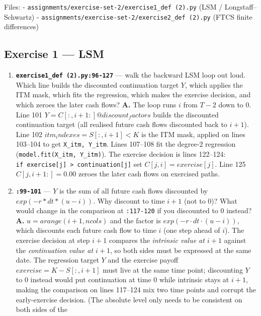 \documentclass[
  11pt,
]{article}
\begin{document}
Files: - \texttt{assignments/exercise-set-2/exercise1\_def\ (2).py} (LSM
/ Longstaff--Schwartz) -
\texttt{assignments/exercise-set-2/exercise2\_def\ (2).py} (FTCS finite
differences)

\hypertarget{exercise-1-lsm}{%
\subsection{Exercise 1 --- LSM}\label{exercise-1-lsm}}

\begin{enumerate}
\def\labelenumi{\arabic{enumi}.}
\item
  \textbf{\texttt{exercise1\_def\ (2).py:96-127}} --- walk the backward
  LSM loop out loud. Which line builds the discounted continuation
  target \(Y\), which applies the ITM mask, which fits the regression,
  which makes the exercise decision, and which zeroes the later cash
  flows? \textbf{A.} The loop runs \(i\) from \(T−2\) down to \(0\).
  Line 101 \(Y = C[:, i+1:] @ discount_factors\) builds the discounted
  continuation target (all realised future cash flows discounted back to
  \(i+1\)). Line 102 \(itm_indexes = S[:,i+1] < K\) is the ITM mask,
  applied on lines 103--104 to get \texttt{X\_itm,\ Y\_itm}. Lines
  107--108 fit the degree-2 regression
  (\texttt{model.fit(X\_itm,\ Y\_itm)}). The exercise decision is lines
  122--124:
  \texttt{if\ exercise{[}j{]}\ \textgreater{}\ continuation{[}j{]}} set
  \(C[j,i] = exercise[j]\). Line 125 \(C[j,i+1:] = 0.00\) zeroes the
  later cash flows on exercised paths.
\item
  \textbf{\texttt{:99-101}} --- \(Y\) is the sum of all future cash
  flows discounted by \(exp(-r*dt*(u-i))\). Why discount to time \(i+1\)
  (not to \(0\))? What would change in the comparison at
  \texttt{:117-120} if you discounted to \(0\) instead? \textbf{A.}
  \(u = arange(i+1, ncols)\) and the factor is \(exp(−r·dt·(u−i))\),
  which discounts each future cash flow to time \(i\) (one step ahead of
  \(i\)). The exercise decision at step \(i+1\) compares the
  \emph{intrinsic value at \(i+1\)} against the \emph{continuation value
  at \(i+1\)}, so both sides must be expressed at the same date. The
  regression target \(Y\) and the exercise payoff
  \(exercise = K − S[:,i+1]\) must live at the same time point;
  discounting \(Y\) to 0 instead would put continuation at time 0 while
  intrinsic stays at \(i+1\), making the comparison on lines 117--124
  mix two time points and corrupt the early-exercise decision. (The
  absolute level only needs to be consistent on both sides of the

\end{enumerate}
\end{document}
